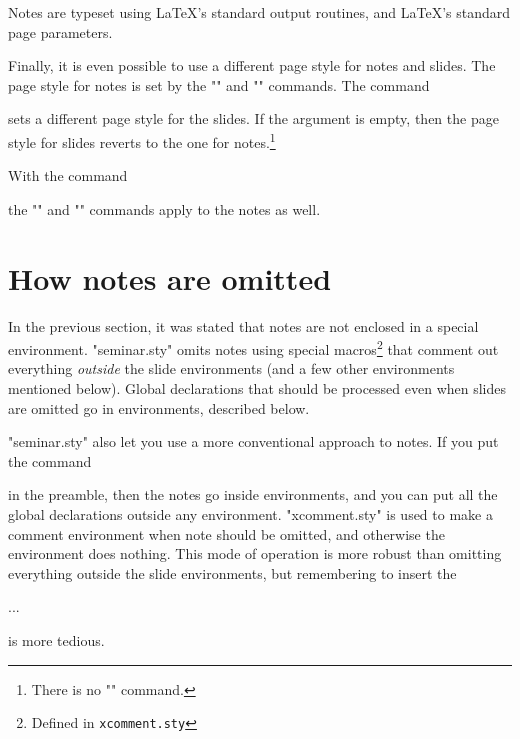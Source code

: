 Notes are typeset using \LaTeX's standard output routines, and \LaTeX's
standard page parameters.

 Finally, it is even possible to use a different page style for notes and
slides. The page style for notes is set by the "\pagestyle" and
"\thispagestyle" commands. The command
\begin{MD}
\end{MD}
sets a different page style for the slides. If the argument is empty, then the
page style for slides reverts to the one for notes.\footnote{There is no
"\thisslidepagestyle" command.}

With the command
\begin{MD}
  \onlynotestoo
\end{MD}
the "\onlyslides" and "\notslides" commands apply to the notes as well.


\section{How notes are omitted\label{omit}}

In the previous section, it was stated that notes are not enclosed in a
special environment. "seminar.sty" omits notes using special
macros\footnote{Defined in {\tt xcomment.sty}} that comment out everything
{\em outside} the slide environments (and a few other environments mentioned
below). Global declarations that should be processed even when slides are
omitted go in  environments, described below.

"seminar.sty" also let you use a more conventional approach to notes. If you
put the command
\begin{MD}
  \noxcomment
\end{MD}
in the preamble, then the notes go inside  environments, and you can
put all the global declarations outside any environment. "xcomment.sty" is
used to make  a comment environment when note should be omitted, and
otherwise the  environment does nothing. This mode of operation is
more robust than omitting everything outside the slide environments, but
remembering to insert the
\begin{LVerbatim}
  \begin{note} ... \end{note}
\end{LVerbatim}
is more tedious.

